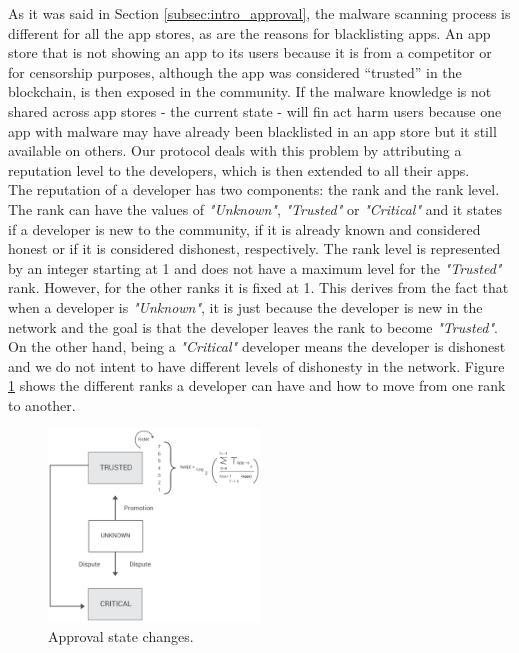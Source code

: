 As it was said in Section \ref{subsec:intro_approval}, the malware scanning process is different for all the app stores, as are the reasons for blacklisting apps. An app store that is not showing an app to its users because it is from a competitor or for censorship purposes, although the app was considered ``trusted'' in the blockchain, is then exposed in the community. If the malware knowledge is not shared across app stores - the current state - will fin act harm users because one app with malware may have already been blacklisted in an app store but it still available on others. Our protocol deals with this problem by attributing a reputation level to the developers, which is then extended to all their apps. \\

The reputation of a developer has two components: the rank and the rank level. The rank can have the values of \textit{"Unknown"}, \textit{"Trusted"} or \textit{"Critical"} and it states if a developer is new to the community, if it is already known and considered honest or if it is considered dishonest, respectively. The rank level is represented by an integer starting at 1 and does not have a maximum level for the \textit{"Trusted"} rank. However, for the other ranks it is fixed at 1. This derives from the fact that when a developer is \textit{"Unknown"}, it is just because the developer is new in the network and the goal is that the developer leaves the rank to become \textit{"Trusted"}. On the other hand, being a \textit{"Critical"} developer means the developer is dishonest and we do not intent to have different levels of dishonesty in the network. Figure \ref{fig:approval_state_diagram} shows the different ranks a developer can have and how to move from one rank to another. \\

\begin{figure}[!ht]
\centering
\includegraphics[width=0.5\textwidth]{diagrams/approval_state_diagram.eps}
\caption{Approval state changes.}
\label{fig:approval_state_diagram}
\end{figure}

